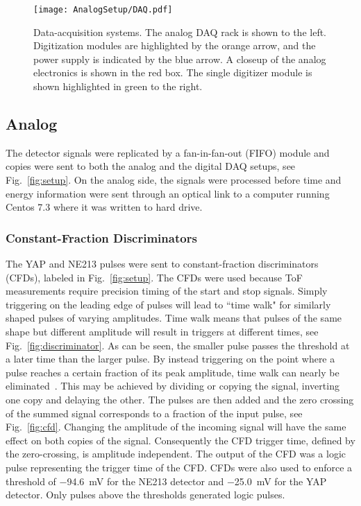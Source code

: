 \documentclass[main.tex]{subfiles}
\begin{document}
\begin{figure}[h]
    \centering
        \texttt{[image: AnalogSetup/DAQ.pdf]}
        \caption[Data-acquisition systems.]{Data-acquisition systems. The analog DAQ rack is shown to the left. Digitization modules are highlighted by the orange arrow, and the power supply is indicated by the blue arrow. A closeup of the analog electronics is shown in the red box. The single digitizer module is shown highlighted in green to the right.}
    \label{fig:DAQ}
\end{figure}

\subsection{Analog}
The detector signals were replicated by a fan-in-fan-out (FIFO) module and copies were sent to both the analog and the digital DAQ setups, see Fig.~\ref{fig:setup}. On the analog side, the signals were processed before time and energy information were sent through an optical link to a computer running Centos 7.3 where it was written to hard drive. 

\subsubsection{Constant-Fraction Discriminators}
The YAP and NE213 pulses were sent to constant-fraction discriminators (CFDs), labeled  in Fig.~\ref{fig:setup}. The CFDs were used because ToF measurements require precision timing of the start and stop signals. Simply triggering on the leading edge of pulses will lead to ``time walk" for similarly shaped pulses of varying amplitudes. Time walk means that pulses of the same shape but different amplitude will result in triggers at different times, see Fig.~\ref{fig:discriminator}. As can be seen, the smaller pulse passes the threshold at a later time than the larger pulse. By instead triggering on the point where a pulse reaches a certain fraction of its peak amplitude, time walk can nearly be eliminated~\cite{Leo}. This may be achieved by dividing or copying the signal, inverting one copy and delaying the other. The pulses are then added and the zero crossing of the summed signal corresponds to a fraction of the input pulse, see Fig.~\ref{fig:cfd}. Changing the amplitude of the incoming signal will have the same effect on both copies of the signal. Consequently the CFD trigger time, defined by the zero-crossing, is amplitude independent. The output of the CFD was a logic pulse representing the trigger time of the CFD. CFDs were also used to enforce a threshold of \SI{-94.6}{mV} for the NE213 detector and \SI{-25.0}{mV} for the YAP detector. Only pulses above the thresholds generated logic pulses.
\end{document}
